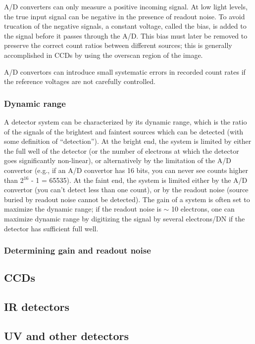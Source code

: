 \documentclass[12pt]{article}
\begin{document}
A/D converters can only measure a positive incoming signal. At low
light levels, the true input signal can be negative in the presence of
readout noise. To avoid trucation of the negative signals, a constant
voltage, called the bias, is added to the signal before it passes
through the A/D. This bias must later be removed to preserve the
correct count ratios between different sources; this is generally
accomplished in CCDs by using the overscan region of the image.

A/D convertors can introduce small systematic errors in recorded count
rates if the reference voltages are not carefully controlled.


\subsubsection{Dynamic range}
A detector system can be characterized by its dynamic range, which is
the ratio of the signals of the brightest and faintest sources which
can be detected (with some definition of ``detection''). At the bright
end, the system is limited by either the full well of the detector (or
the number of electrons at which the detector goes significantly
non-linear), or alternatively by the limitation of the A/D convertor
(e.g., if an A/D convertor has 16 bits, you can never see counts
higher than 2$^{16}$ - 1 = 65535). At the faint end, the system is limited
either by the A/D convertor (you can't detect less than one count), or
by the readout noise (source buried by readout noise cannot be
detected). The gain of a system is often set to maximize the dynamic
range; if the readout noise is $ \sim$ 10 electrons, one can maximize
dynamic range by digitizing the signal by several electrons/DN if the
detector has sufficient full well.


\subsubsection{Determining gain and readout noise}
\subsection{CCDs}
\subsection{IR detectors}
\subsection{UV and other detectors}
\end{document}
